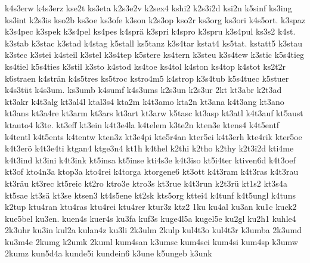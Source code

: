 {    k4s3erw
    k4s3erz
    kse2t
    ks3eta
    k2s3e2v
    k2sex4
    kshi2
    k2s3i2d
    ksi2n
    k5sinf
    ks3ing
    ks3int
    k2s3is
    kso2b
    ks3oe
    ks3ofe
    k3son
    k2s3op
    kso2r
    ks3org
    ks3ori
    k4s5ort.
    k3spaz
    k3s4pec
    k3spek
    k3s4pel
    ks4pes
    k4sprä
    k3spri
    k4spro
    k3spru
    k3s4pul
    ks3s2
    k4st.
    k3stab
    k3stac
    k3stad
    k4stag
    k5stall
    ks5tanz
    k3s4tar
    kstat4
    ks5tat.
    kstatt5
    k3stau
    k3stec
    k3stei
    k4steil
    k3stel
    k3s4tep
    k5stere
    ks4tern
    k3steu
    k3s4tew
    k3stic
    k5s4tieg
    ks4tiel
    k5s4ties
    k3stil
    k3sto
    k4stod
    ks4toe
    ks4tol
    k4ston
    ks4top
    k4stot
    ks2t2r
    k6straen
    k4strän
    k4s5tres
    ks5troc
    kstro4m5
    k4strop
    k3s4tub
    k5s4tuec
    k5stuer
    k4s3tüt
    k4s3um.
    ks3umb
    k4sumf
    k4s3ums
    k2s3un
    k2s3ur
    2kt
    kt3abr
    k2t3ad
    kt3akr
    k4t3alg
    kt3al4l
    ktal3s4
    kta2m
    k4t3amo
    kta2n
    kt3ana
    k4t3ang
    kt3ano
    kt3ans
    kt3a4re
    kt3arm
    kt3ars
    kt3art
    kt3arw
    k5tasc
    kt3asp
    kt3atl
    k4t3auf
    kt5aust
    ktauto4
    k3te.
    kt3eff
    kt3ein
    k4t3e4la
    k4telem
    k3te2n
    kten3e
    ktens4
    k4t5entf
    k4tentl
    k4t5ents
    k4tentw
    kten3z
    kt3e4pi
    kte5r4an
    kter5ei
    k4t3erh
    kte4rik
    kter5oe
    k4t3erö
    k4t3e4ti
    ktgan4
    ktge3n4
    kt1h
    k4thel
    k2thi
    k2tho
    k2thy
    k2t3i2d
    kti4me
    k4t3ind
    kt3ini
    k4t3ink
    kt5insa
    kt5inse
    kti4s3e
    k4t3iso
    kt5i4ter
    ktiven6d
    k4t3oef
    kt3of
    kto4n3a
    ktop3a
    kto4rei
    k4torga
    ktorgene6
    kt3ott
    k4t3ram
    k4t3ras
    k4t3rau
    kt3räu
    kt3rec
    kt5reic
    kt2ro
    ktro3e
    ktro3s
    kt3rue
    k4t3run
    k2t3rü
    kt1s2
    kt3s4a
    kt5sae
    kt3sä
    kt3se
    ktsen3
    kt4s5ene
    kt2sk
    kts5org
    kttei4
    k4tunf
    k4t5ungl
    k4tuns
    k2tup
    ktu4ran
    ktu4ras
    ktu4rei
    ktu4rer
    ktur3z
    ktz2
    1ku
    ku4al
    ku3an
    ku1c
    kuck2
    kue5bel
    ku3en.
    kuen4s
    kuer4s
    ku3fa
    kuf3s
    kuge4l5a
    kugel5e
    ku2gl
    ku2h1
    kuhle4
    2k3uhr
    ku3in
    kul2a
    kulan4z
    ku3li
    2k3ulm
    2kulp
    kul4t3o
    kul4t3r
    k3umba
    2k3umd
    ku3m4e
    2kumg
    k2umk
    2kuml
    kum4san
    k3umsc
    kum4sei
    kum4si
    kum4sp
    k3umw
    2kumz
    kun5d4a
    kunde5i
    kundein6
    k3une
    k5ungeb
    k3unk
}
